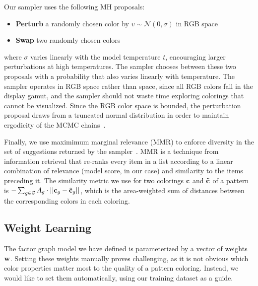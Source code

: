 Our sampler uses the following MH proposals:
\begin{itemize}
	\item{\textbf{Perturb} a randomly chosen color by $v \sim \mathcal{N}(0, \sigma)$ in RGB space}
	\item{\textbf{Swap} two randomly chosen colors}
\end{itemize}
where $\sigma$ varies linearly with the model temperature $t$, encouraging larger perturbations at high temperatures. The sampler chooses between these two proposals with a probability that also varies linearly with temperature. The sampler operates in RGB space rather than \lab space, since all RGB colors fall in the display gamut, and the sampler should not waste time exploring colorings that cannot be visualized. Since the RGB color space is bounded, the perturbation proposal draws from a truncated normal distribution in order to maintain ergodicity of the MCMC chains~\cite{TruncatedGaussians}.

Finally, we use maximimum marginal relevance (MMR) to enforce diversity in the set of suggestions returned by the sampler~\cite{MMR}. MMR is a technique from information retrieval that re-ranks every item in a list according to a linear combination of relevance (model score, in our case) and similarity to the items preceding it. The similarity metric we use for two colorings $\mathbf{c}$ and $\tilde{\mathbf{c}}$ of a pattern is $- \sum_{g \in \mathcal{G}} {A_g \cdot ||\mathbf{c}_g - \tilde{\mathbf{c}}_g||}$, which is the area-weighted sum of \lab distances between the corresponding colors in each coloring.

\subsection{Weight Learning}
\label{sec:weights}

The factor graph model we have defined is parameterized by a vector of weights $\mathbf{w}$. Setting these weights manually proves challenging, as it is not obvious which color properties matter most to the quality of a pattern coloring. Instead, we would like to set them automatically, using our training dataset as a guide.

